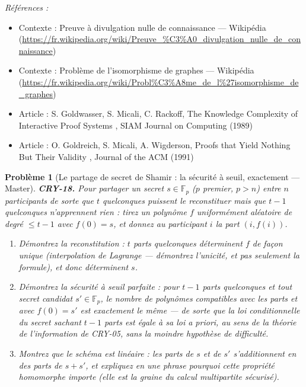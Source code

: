 \documentclass[11pt]{article}
\newtheorem{problem}{Problème}
\newenvironment{refs}{\par\small\noindent\emph{Références :}\begin{itemize}\setlength\itemsep{0pt}}{\end{itemize}\normalsize}
\begin{document}
\begin{refs}
\item Contexte : Preuve à divulgation nulle de connaissance --- Wikipédia (\url{https://fr.wikipedia.org/wiki/Preuve_%C3%A0_divulgation_nulle_de_connaissance})
\item Contexte : Problème de l'isomorphisme de graphes --- Wikipédia (\url{https://fr.wikipedia.org/wiki/Probl%C3%A8me_de_l%27isomorphisme_de_graphes})
\item Article : S. Goldwasser, S. Micali, C. Rackoff, \og{} The Knowledge Complexity of Interactive Proof Systems \fg{}, SIAM Journal on Computing (1989)
\item Article : O. Goldreich, S. Micali, A. Wigderson, \og{} Proofs that Yield Nothing But Their Validity \fg{}, Journal of the ACM (1991)
\end{refs}

\bigskip

\begin{problem}[{Le partage de secret de Shamir : la sécurité à seuil, exactement --- Master}]
\textbf{CRY-18.} Pour partager un secret $s \in \mathbb{F}_p$
($p$ premier, $p > n$) entre $n$ participants de sorte que $t$ quelconques
puissent le reconstituer mais que $t-1$ quelconques n'apprennent rien : tirez un polynôme
$f$ uniformément aléatoire de degré $\le t-1$ avec $f(0) = s$, et donnez au participant
$i$ la part $(i, f(i))$.
\begin{enumerate}
\item[(a)] Démontrez la reconstitution : $t$ parts quelconques déterminent $f$ de façon unique
(interpolation de Lagrange --- démontrez l'unicité, et pas seulement la formule), et donc
déterminent $s$.
\item[(b)] Démontrez la sécurité à seuil parfaite : pour $t-1$ parts quelconques et
\textit{tout} secret candidat $s' \in \mathbb{F}_p$, le nombre de polynômes compatibles avec
les parts et avec $f(0) = s'$ est exactement le même --- de sorte que la loi conditionnelle du
secret sachant $t-1$ parts est égale à sa loi a priori, au sens de la théorie de
l'information de CRY-05, sans la moindre hypothèse de difficulté.
\item[(c)] Montrez que le schéma est linéaire : les parts de $s$ et de $s'$ s'additionnent en des
parts de $s + s'$, et expliquez en une phrase pourquoi cette propriété homomorphe importe
(elle est la graine du calcul multipartite sécurisé).
\end{enumerate}

\end{problem}
\end{document}
